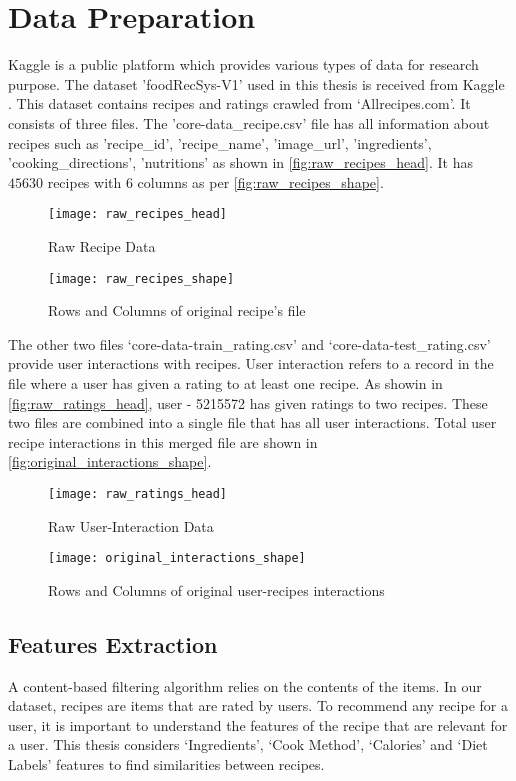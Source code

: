 
\section{Data Preparation}
\label{sec:data_prep}
Kaggle is a public platform which provides various types of data for research purpose. The dataset 'foodRecSys-V1' used in this thesis is received from Kaggle \cite{48}. This dataset contains recipes and ratings crawled from `Allrecipes.com'. It consists of three files. The 'core-data\_recipe.csv' file has all information about recipes such as 'recipe\_id', 'recipe\_name', 'image\_url', 'ingredients', 'cooking\_directions', 'nutritions' as shown in \autoref{fig:raw_recipes_head}. It has $45630$ recipes with $6$ columns as per \autoref{fig:raw_recipes_shape}.

\begin{figure}[H]
	\centering
	\texttt{[image: raw\_recipes\_head]}
	\caption{Raw Recipe Data}
	\label{fig:raw_recipes_head}
\end{figure}

\begin{figure}[H]
	\centering
	\texttt{[image: raw\_recipes\_shape]}
	\caption{Rows and Columns of original recipe's file}
	\label{fig:raw_recipes_shape}
\end{figure}

\noindent The other two files `core-data-train\_rating.csv' and `core-data-test\_rating.csv' provide user interactions with recipes. User interaction refers to a record in the file where a user has given a rating to at least one recipe. As showin in \autoref{fig:raw_ratings_head}, user - 5215572 has given ratings to two recipes. These two files are combined into a single file that has all user interactions.  Total user recipe interactions in this merged file are shown in \autoref{fig:original_interactions_shape}.

\begin{figure}[H]
	\centering
	\texttt{[image: raw\_ratings\_head]}
	\caption{Raw User-Interaction Data}
	\label{fig:raw_ratings_head}
\end{figure}

\begin{figure}[H]
	\centering
	\texttt{[image: original\_interactions\_shape]}
	\caption{Rows and Columns of original user-recipes interactions }
	\label{fig:original_interactions_shape}
\end{figure}  


\subsection{Features Extraction}
A content-based filtering algorithm relies on the contents of the items. In our dataset, recipes are items that are rated by users. To recommend any recipe for a user, it is important to understand the features of the recipe that are relevant for a user. This thesis considers  `Ingredients', `Cook Method', `Calories' and `Diet Labels' features to find similarities between recipes.

